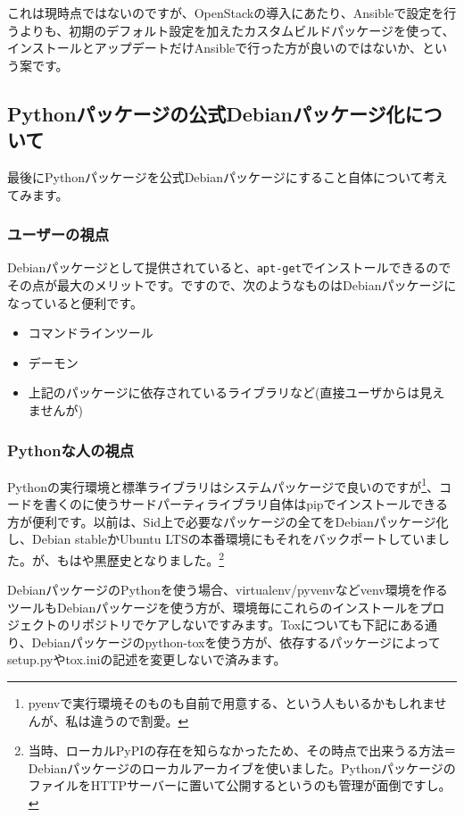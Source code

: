 \documentclass[mingoth,a4paper]{jsarticle}
\begin{document}
これは現時点ではないのですが、OpenStackの導入にあたり、Ansibleで設定を行うよりも、初期のデフォルト設定を加えたカスタムビルドパッケージを使って、インストールとアップデートだけAnsibleで行った方が良いのではないか、という案です。

\subsection{Pythonパッケージの公式Debianパッケージ化について}

最後にPythonパッケージを公式Debianパッケージにすること自体について考えてみます。

\subsubsection{ユーザーの視点}
Debianパッケージとして提供されていると、\texttt{apt-get}でインストールできるのでその点が最大のメリットです。ですので、次のようなものはDebianパッケージになっていると便利です。

\begin{itemize}
\item コマンドラインツール
\item デーモン
\item 上記のパッケージに依存されているライブラリなど(直接ユーザからは見えませんが)
\end{itemize}

\subsubsection{Pythonな人の視点}

Pythonの実行環境と標準ライブラリはシステムパッケージで良いのですが\footnote{pyenvで実行環境そのものも自前で用意する、という人もいるかもしれませんが、私は違うので割愛。}、コードを書くのに使うサードパーティライブラリ自体はpipでインストールできる方が便利です。以前は、Sid上で必要なパッケージの全てをDebianパッケージ化し、Debian stableかUbuntu LTSの本番環境にもそれをバックポートしていました。が、もはや黒歴史となりました。\footnote{当時、ローカルPyPIの存在を知らなかったため、その時点で出来うる方法＝Debianパッケージのローカルアーカイブを使いました。PythonパッケージのファイルをHTTPサーバーに置いて公開するというのも管理が面倒ですし。}

DebianパッケージのPythonを使う場合、virtualenv/pyvenvなどvenv環境を作るツールもDebianパッケージを使う方が、環境毎にこれらのインストールをプロジェクトのリポジトリでケアしないですみます。Toxについても下記にある通り、Debianパッケージのpython-toxを使う方が、依存するパッケージによってsetup.pyやtox.iniの記述を変更しないで済みます。
\end{document}
